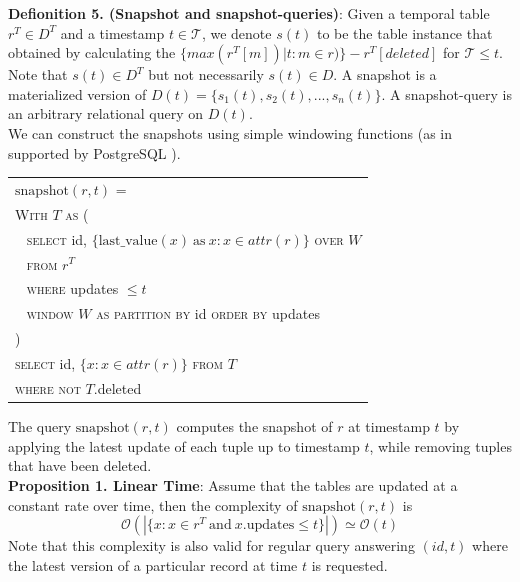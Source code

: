 \textbf{Defionition 5. (Snapshot and snapshot-queries)}: Given a temporal table $r^T \in D^T$ and a timestamp $t \in \mathcal{T}$, we denote $s(t)$ to be the table instance that obtained by calculating the $\{max(r^T[m])|t : m\in r)\}-r^T[deleted]$ for $\mathcal{T}\leq t$. Note that $s(t) \in D^T$ but not necessarily $s(t) \in D$. A snapshot is a materialized version of $D(t) = \{s_1(t),s_2(t),...,s_n(t)\}$. A snapshot-query is an arbitrary relational query on $D(t)$.\\

We can construct the snapshots using simple windowing functions (as in supported
by PostgreSQL \cite{momjian2001postgresql}).

    \vspace{1em}
\begin{center}

{\small
	\begin{tabular}{|l|} \hline
		$\mathrm{snapshot}(r, t)$ = \\
		\verb|| \textsc{With} $T$ \textsc{as} ( \\
		\verb| | \textsc{select} id, $\{\mathrm{last\_value}(x) \mathrm{\ as\ } x:
		x\in attr(r)\}$ \textsc{over} $W$ \\
		\verb| | \textsc{from} $r^T$ \\
		\verb| | \textsc{where} updates $\leq t$ \\
		\verb| | \textsc{window} $W$ \textsc{as} 
		\textsc{partition by} id \textsc{order by} updates\\
		\verb|| ) \\
		\verb|| \textsc{select} id, $\{x: x\in attr(r)\}$ \textsc{from} $T$ \\
		\verb|| \textsc{where not} $T.$deleted \\ \hline
	\end{tabular}
}
\end{center}

The query $\mathrm{snapshot}(r, t)$ computes the snapshot of $r$ at timestamp
$t$ by applying the latest update of each tuple up to timestamp $t$, while
removing tuples that have been deleted.\\
\textbf{Proposition 1. Linear Time}: Assume that the tables are updated at a constant rate over time,
then the complexity of $\mathrm{snapshot}(r, t)$ is 
$$\mathcal{O}(|\{x: x\in r^T\mathrm{\ and\ } x.\mathrm{updates} \leq t\}|)
\simeq \mathcal{O}(t)$$
Note that this complexity is also valid for regular query answering $(id,t)$ where the latest version of a particular record at time $t$ is requested.

